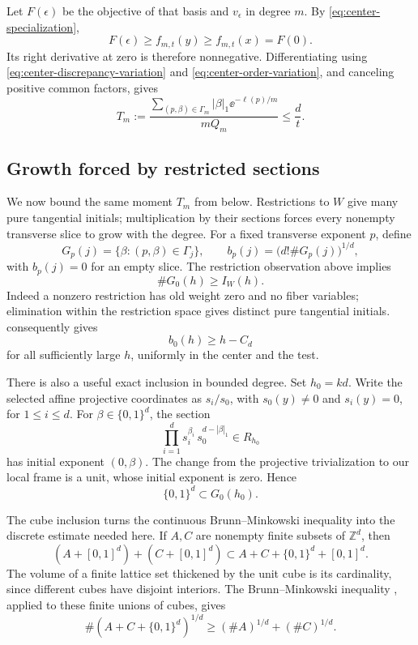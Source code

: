 Let $F(\epsilon)$ be the objective of that basis and $v_\epsilon$ in degree $m$. By \eqref{eq:center-specialization},
\[
 F(\epsilon)\ge f_{m,t}(y)\ge f_{m,t}(x)=F(0).
\]
Its right derivative at zero is therefore nonnegative. Differentiating using \eqref{eq:center-discrepancy-variation} and \eqref{eq:center-order-variation}, and canceling positive common factors, gives
\begin{equation}\label{eq:center-variation-upper}
 T_m:=\frac{\displaystyle\sum_{(p,\beta)\in\Gamma_m}
                 |\beta|_1\ee^{-\ell(p)/m}}
                {mQ_m}
       \le\frac dt.
\end{equation}

\subsection{Growth forced by restricted sections}

We now bound the same moment $T_m$ from below. Restrictions to $W$ give many pure tangential initials; multiplication by their sections forces every nonempty transverse slice to grow with the degree. For a fixed transverse exponent $p$, define
\[
 G_p(j)=\{\beta:(p,\beta)\in\Gamma_j\},
 \qquad b_p(j)=\bigl(d!\#G_p(j)\bigr)^{1/d},
\]
with $b_p(j)=0$ for an empty slice. The restriction observation above implies
\[
 \#G_0(h)\ge I_W(h).
\]
Indeed a nonzero restriction has old weight zero and no fiber variables; elimination within the restriction space gives distinct pure tangential initials.  consequently gives
\begin{equation}\label{eq:center-pure-growth}
 b_0(h)\ge h-C_d
\end{equation}
for all sufficiently large $h$, uniformly in the center and the test.

There is also a useful exact inclusion in bounded degree. Set $h_0=kd$. Write the selected affine projective coordinates as $s_i/s_0$, with $s_0(y)\ne0$ and $s_i(y)=0$, for $1\le i\le d$. For $\beta\in\{0,1\}^d$, the section
\[
 \prod_{i=1}^d s_i^{\beta_i}\,s_0^{d-|\beta|_1}\in R_{h_0}
\]
has initial exponent $(0,\beta)$. The change from the projective trivialization to our local frame is a unit, whose initial exponent is zero. Hence
\begin{equation}\label{eq:center-cube}
 \{0,1\}^d\subset G_0(h_0).
\end{equation}

The cube inclusion turns the continuous Brunn--Minkowski inequality into the discrete estimate needed here. If $A,C$ are nonempty finite subsets of $\mathbb{Z}^d$, then
\[
 (A+[0,1]^d)+(C+[0,1]^d)
 \subset A+C+\{0,1\}^d+[0,1]^d.
\]
The volume of a finite lattice set thickened by the unit cube is its cardinality, since different cubes have disjoint interiors. The Brunn--Minkowski inequality \cite[Theorem~4.1]{gardner2002}, applied to these finite unions of cubes, gives
\begin{equation}\label{eq:discrete-bm}
 \#(A+C+\{0,1\}^d)^{1/d}
 \ge (\#A)^{1/d}+(\#C)^{1/d}.
\end{equation}

